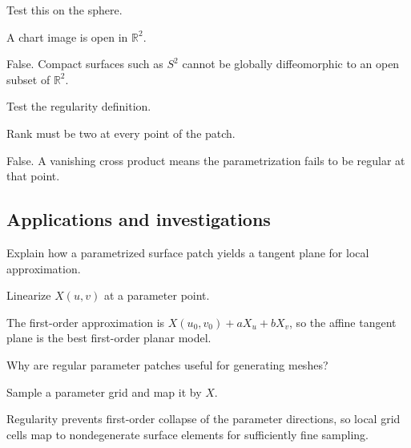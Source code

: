 \begin{exercise}\label{exr:vii14-ped-11}
Test this on the sphere.
\end{exercise}
\begin{hint}
A chart image is open in \(\mathbb R^2\).
\end{hint}
\begin{solution}
False.  Compact surfaces such as \(S^2\) cannot be globally diffeomorphic to an open subset of \(\mathbb R^2\).
\end{solution}

\begin{exercise}\label{exr:vii14-ped-12}
Test the regularity definition.
\end{exercise}
\begin{hint}
Rank must be two at every point of the patch.
\end{hint}
\begin{solution}
False.  A vanishing cross product means the parametrization fails to be regular at that point.
\end{solution}

\subsection*{Applications and investigations}

\begin{exercise}\label{exr:vii14-ped-13}
Explain how a parametrized surface patch yields a tangent plane for local approximation.
\end{exercise}
\begin{hint}
Linearize \(X(u,v)\) at a parameter point.
\end{hint}
\begin{solution}
The first-order approximation is \(X(u_0,v_0)+aX_u+bX_v\), so the affine tangent plane is the best first-order planar model.
\end{solution}

\begin{exercise}\label{exr:vii14-ped-14}
Why are regular parameter patches useful for generating meshes?
\end{exercise}
\begin{hint}
Sample a parameter grid and map it by \(X\).
\end{hint}
\begin{solution}
Regularity prevents first-order collapse of the parameter directions, so local grid cells map to nondegenerate surface elements for sufficiently fine sampling.
\end{solution}

